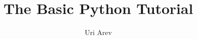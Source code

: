 \documentclass[a4paper,10pt,oneside]{book}
\begin{document}
\title{The Basic Python Tutorial}
\author{Uri Arev}
\date{} %
\maketitle
\tableofcontents


\end{document}
